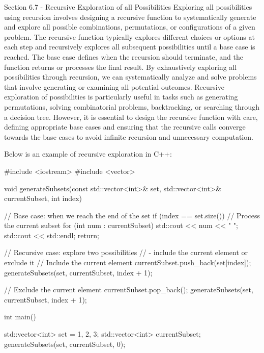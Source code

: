 \begin{notes}{Section 6.7 - Recursive Exploration of all Possibilities}
    Exploring all possibilities using recursion involves designing a recursive function to systematically generate and explore all possible combinations, permutations, or configurations of a given problem. The recursive function typically explores different choices or options at each step and recursively explores all subsequent possibilities until a base 
    case is reached. The base case defines when the recursion should terminate, and the function returns or processes the final result. By exhaustively exploring all possibilities through recursion, we can systematically analyze and solve problems that involve generating or examining all potential outcomes. Recursive exploration of possibilities is particularly 
    useful in tasks such as generating permutations, solving combinatorial problems, backtracking, or searching through a decision tree. However, it is essential to design the recursive function with care, defining appropriate base cases and ensuring that the recursive calls converge towards the base cases to avoid infinite recursion and unnecessary computation.
    
    \begin{highlight}
        Below is an example of recursive exploration in C++:
    
    \begin{code}[C++]
    #include <iostream>
    #include <vector>
    
    void generateSubsets(const std::vector<int>& set, 
                        std::vector<int>& currentSubset, int index) {
        // Base case: when we reach the end of the set
        if (index == set.size()) {
            // Process the current subset
            for (int num : currentSubset) {
                std::cout << num << " ";
            }
            std::cout << std::endl;
            return;
        }
    
        // Recursive case: explore two possibilities 
        // - include the current element or exclude it
        // Include the current element
        currentSubset.push_back(set[index]);
        generateSubsets(set, currentSubset, index + 1);
    
        // Exclude the current element
        currentSubset.pop_back();
        generateSubsets(set, currentSubset, index + 1);
    }
    
    int main() {
        std::vector<int> set = {1, 2, 3};
        std::vector<int> currentSubset;
        generateSubsets(set, currentSubset, 0);
    
}
\end{code}
\end{highlight}
\end{notes}
